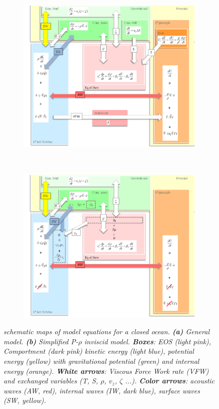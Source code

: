 \documentclass[a4paper,11pt]{article}
\begin{document}
\begin{figure}[!h]
	\centering		
	\begin{subfigure}{0.49\linewidth}
		\includegraphics[width=1\linewidth]{FIGURES/MapA.png}
		\caption{}
	\end{subfigure}
	~
	\centering
	\begin{subfigure}{0.49\linewidth}
		\includegraphics[width=1\linewidth]{FIGURES/MapD.png}
		\caption{}
	\end{subfigure}
	
\caption{ \textit{schematic maps of model equations for a closed ocean.  \textbf{(a)} General model. \textbf{(b)} Simplified P-$\rho$ inviscid model.  \textbf{Boxes}:  EOS (light pink), Comportment (dark pink) kinetic energy (light blue), potential energy (yellow) with gravitational potential (green) and internal energy (orange).  \textbf{White arrows}: Viscous Force Work rate (VFW) and exchanged variables (T, S, $\rho$, $v_z$, $\zeta$ ...).  \textbf{Color arrows}: acoustic waves (AW, red), internal waves (IW, dark blue), surface waves (SW, yellow).}}
	\label{ModelMap}
\end{figure}
\end{document}
